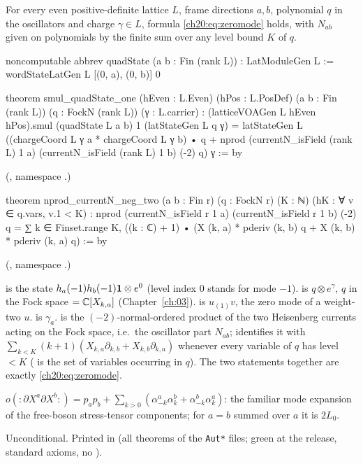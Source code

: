 \begin{lemma}\label{ch20:lem:zeromode}
For every even positive-definite lattice $L$, frame directions $a,b$, polynomial $q$ in the oscillators and charge
$\gamma\in L$, formula \eqref{ch20:eq:zeromode} holds, with $N_{ab}$ given on polynomials by the finite sum over any
level bound $K$ of $q$.
\end{lemma}
\begin{leancode}
noncomputable abbrev quadState (a b : Fin (rank L)) : LatModuleGen L :=
  wordStateLatGen L [(0, a), (0, b)] 0

theorem smul_quadState_one (hEven : L.Even) (hPos : L.PosDef) (a b : Fin (rank L))
    (q : FockN (rank L)) (γ : L.carrier) :
    (latticeVOAGen L hEven hPos).smul (quadState L a b) 1 (latStateGen L q γ)
      = latStateGen L
          ((chargeCoord L γ a * chargeCoord L γ b) • q
            + nprod (currentN_isField (rank L) 1 a) (currentN_isField (rank L) 1 b) (-2) q) γ := by
\end{leancode}
(, namespace .)
\begin{leancode}
theorem nprod_currentN_neg_two (a b : Fin r) (q : FockN r) (K : ℕ)
    (hK : ∀ v ∈ q.vars, v.1 < K) :
    nprod (currentN_isField r 1 a) (currentN_isField r 1 b) (-2) q
      = ∑ k ∈ Finset.range K, ((k : ℂ) + 1) •
          (X (k, a) * pderiv (k, b) q + X (k, b) * pderiv (k, a) q) := by
\end{leancode}
(, namespace .)
\begin{dictionary}
 is the state $h_a(-1)h_b(-1)\mathbf 1\otimes e^0$ (level index $0$
stands for mode $-1$).   is $q\otimes e^\gamma$, $q$ in the Fock space 
$={\mathbb{C}}[X_{k,a}]$ (Chapter~\ref{ch:03}).   is $u_{(1)}v$, the zero mode of
a weight-two $u$.   is $\gamma_a$.   is the
$(-2)$-normal-ordered product of the two Heisenberg currents acting on the Fock space, i.e.\ the oscillator part
$N_{ab}$;  identifies it with
$\sum_{k<K}(k+1)(X_{k,a}\partial_{k,b}+X_{k,b}\partial_{k,a})$ whenever every variable of $q$ has level $<K$
( is the set of variables occurring in $q$).  The two statements together are exactly
\eqref{ch20:eq:zeromode}.
\end{dictionary}
\begin{physics}
$o({:}\partial X^a\partial X^b{:})=p_ap_b+\sum_{k>0}(\alpha^a_{-k}\alpha^b_k+\alpha^b_{-k}\alpha^a_k)$: the familiar
mode expansion of the free-boson stress-tensor components; for $a=b$ summed over $a$ it is $2L_0$.
\end{physics}
\begin{status}
Unconditional.  Printed in  (all theorems of the \texttt{Aut*} files; green at the release, standard axioms, no ).
\end{status}

